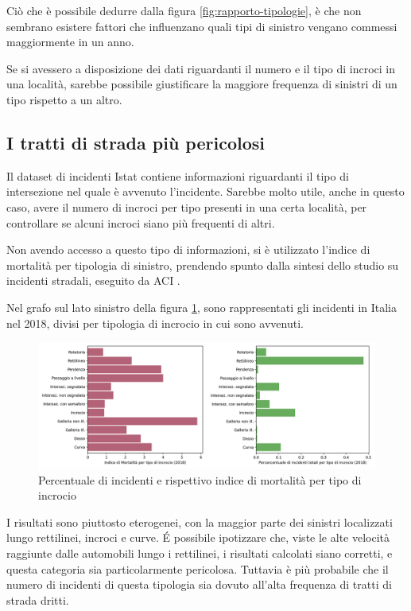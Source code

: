 \documentclass[a4paper,12pt]{report}
\begin{document}
Ciò che è possibile dedurre dalla figura \ref{fig:rapporto-tipologie}, è che non 
sembrano esistere fattori che influenzano quali tipi di sinistro 
vengano commessi maggiormente in un anno. 

Se si avessero a disposizione dei dati riguardanti il numero e il tipo 
di incroci in una località, sarebbe possibile giustificare 
la maggiore frequenza di sinistri di un tipo rispetto a un altro. 

\subsection{I tratti di strada più pericolosi}

Il dataset di incidenti Istat contiene informazioni riguardanti il tipo di 
intersezione nel quale è avvenuto l'incidente.
Sarebbe molto utile, anche in questo caso, avere il numero di incroci per tipo 
presenti in una certa località, per controllare se alcuni incroci siano più 
frequenti di altri.

Non avendo accesso a questo tipo di informazioni, si è utilizzato l'indice di 
mortalità per tipologia di sinistro, prendendo spunto dalla sintesi dello 
studio su incidenti stradali, eseguito da ACI \cite{ACI:2}.

Nel grafo sul lato sinistro della figura \ref{fig:tipo-intersezioni}, 
sono rappresentati gli incidenti in Italia nel 2018, divisi per tipologia 
di incrocio in cui sono avvenuti.

\begin{figure}
    \includegraphics[width=\linewidth]{img_unite/intersezioni_indice_mortalita.png}
    \caption{Percentuale di incidenti e rispettivo indice di mortalità per tipo di incrocio}
    \label{fig:tipo-intersezioni}
\end{figure}

I risultati sono piuttosto eterogenei, con la maggior parte dei sinistri 
localizzati lungo rettilinei, incroci e curve. 
\'E possibile ipotizzare che, viste le alte velocità raggiunte dalle automobili 
lungo i rettilinei, i risultati calcolati siano corretti, e questa categoria sia 
particolarmente pericolosa.
Tuttavia è più probabile che il numero di incidenti di questa tipologia sia dovuto 
all'alta frequenza di tratti di strada dritti.
\end{document}
